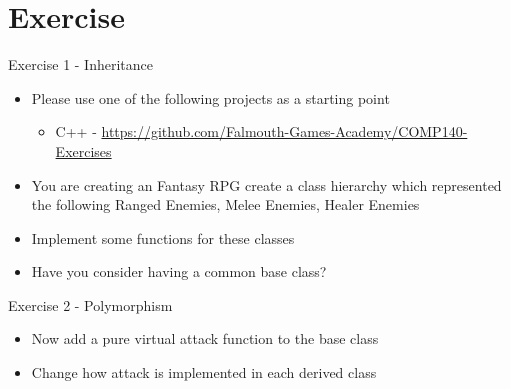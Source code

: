 \part{Exercise}
\frame{\partpage}

\begin{frame}{Exercise 1 - Inheritance}
	\begin{itemize}
		\item Please use one of the following projects as a starting point
		\begin{itemize}
			\item C++ - \url{https://github.com/Falmouth-Games-Academy/COMP140-Exercises}
		\end{itemize}
		\item You are creating an Fantasy RPG create a class hierarchy which represented the following Ranged Enemies, Melee Enemies, Healer Enemies
		\item Implement some functions for these classes
		\item Have you consider having a common base class?
	\end{itemize}
\end{frame}

\begin{frame}{Exercise 2 - Polymorphism}
	\begin{itemize}
		\item Now add a pure virtual attack function to the base class
		\item Change how attack is implemented in each derived class
	\end{itemize}
\end{frame}